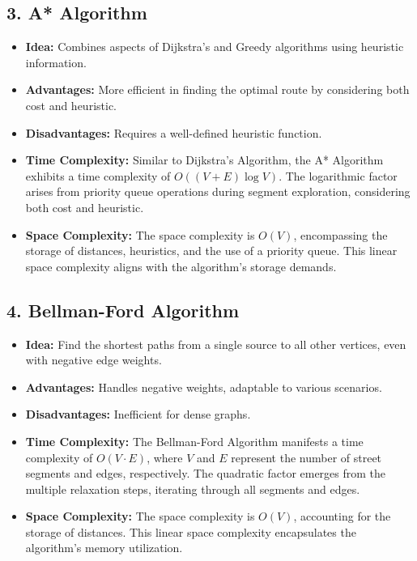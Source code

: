 \documentclass[a4paper, 12pt]{article}
\begin{document}
	\subsection*{3. A* Algorithm}
	\begin{itemize}
		\item \textbf{Idea:} Combines aspects of Dijkstra's and Greedy algorithms using heuristic information.
		\item \textbf{Advantages:} More efficient in finding the optimal route by considering both cost and heuristic.
		\item \textbf{Disadvantages:} Requires a well-defined heuristic function.
	\item \textbf{Time Complexity:} Similar to Dijkstra's Algorithm, the A* Algorithm exhibits a time complexity of $O((V + E) \log V)$. The logarithmic factor arises from priority queue operations during segment exploration, considering both cost and heuristic.
	\item \textbf{Space Complexity:} The space complexity is $O(V)$, encompassing the storage of distances, heuristics, and the use of a priority queue. This linear space complexity aligns with the algorithm's storage demands.
	
	\end{itemize}
	
	\subsection*{4. Bellman-Ford Algorithm}
	\begin{itemize}
		\item \textbf{Idea:} Find the shortest paths from a single source to all other vertices, even with negative edge weights.
		\item \textbf{Advantages:} Handles negative weights, adaptable to various scenarios.
		\item \textbf{Disadvantages:} Inefficient for dense graphs. 
		\item \textbf{Time Complexity:} The Bellman-Ford Algorithm manifests a time complexity of $O(V \cdot E)$, where $V$ and $E$ represent the number of street segments and edges, respectively. The quadratic factor emerges from the multiple relaxation steps, iterating through all segments and edges.
		\item \textbf{Space Complexity:} The space complexity is $O(V)$, accounting for the storage of distances. This linear space complexity encapsulates the algorithm's memory utilization.
		
	\end{itemize}
	
\end{document}
